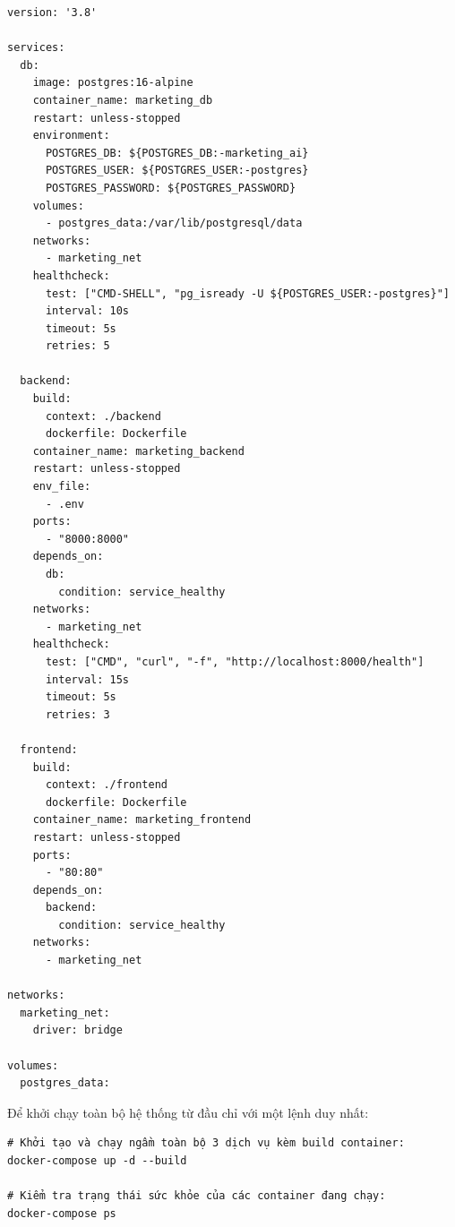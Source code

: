\begin{footnotesize}
\begin{verbatim}
version: '3.8'

services:
  db:
    image: postgres:16-alpine
    container_name: marketing_db
    restart: unless-stopped
    environment:
      POSTGRES_DB: ${POSTGRES_DB:-marketing_ai}
      POSTGRES_USER: ${POSTGRES_USER:-postgres}
      POSTGRES_PASSWORD: ${POSTGRES_PASSWORD}
    volumes:
      - postgres_data:/var/lib/postgresql/data
    networks:
      - marketing_net
    healthcheck:
      test: ["CMD-SHELL", "pg_isready -U ${POSTGRES_USER:-postgres}"]
      interval: 10s
      timeout: 5s
      retries: 5

  backend:
    build:
      context: ./backend
      dockerfile: Dockerfile
    container_name: marketing_backend
    restart: unless-stopped
    env_file:
      - .env
    ports:
      - "8000:8000"
    depends_on:
      db:
        condition: service_healthy
    networks:
      - marketing_net
    healthcheck:
      test: ["CMD", "curl", "-f", "http://localhost:8000/health"]
      interval: 15s
      timeout: 5s
      retries: 3

  frontend:
    build:
      context: ./frontend
      dockerfile: Dockerfile
    container_name: marketing_frontend
    restart: unless-stopped
    ports:
      - "80:80"
    depends_on:
      backend:
        condition: service_healthy
    networks:
      - marketing_net

networks:
  marketing_net:
    driver: bridge

volumes:
  postgres_data:
\end{verbatim}
\end{footnotesize}

Để khởi chạy toàn bộ hệ thống từ đầu chỉ với một lệnh duy nhất:
\begin{footnotesize}
\begin{verbatim}
# Khởi tạo và chạy ngầm toàn bộ 3 dịch vụ kèm build container:
docker-compose up -d --build

# Kiểm tra trạng thái sức khỏe của các container đang chạy:
docker-compose ps
\end{verbatim}
\end{footnotesize}

